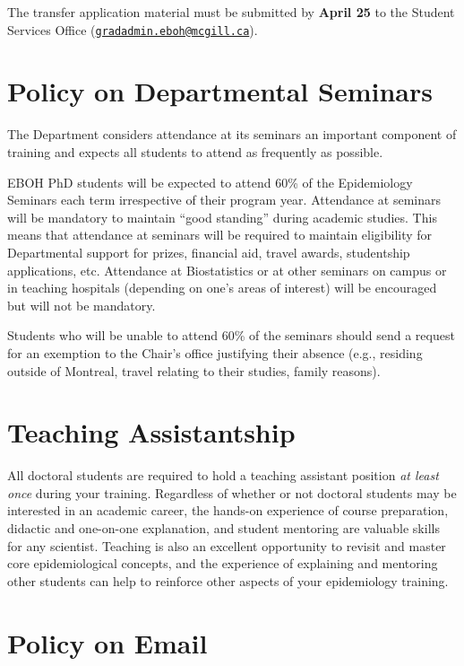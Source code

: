 \documentclass[
  openany]{book}
\begin{document}
The transfer application material must be submitted by \textbf{April 25} to the Student Services Office (\href{mailto:gradadmin.eboh@mcgill.ca}{\nolinkurl{gradadmin.eboh@mcgill.ca}}).

\hypertarget{policy-on-departmental-seminars}{%
\section{Policy on Departmental Seminars}\label{policy-on-departmental-seminars}}

The Department considers attendance at its seminars an important component of training and expects all students to attend as frequently as possible.

EBOH PhD students will be expected to attend 60\% of the Epidemiology Seminars each term irrespective of their program year. Attendance at seminars will be mandatory to maintain ``good standing'' during academic studies. This means that attendance at seminars will be required to maintain eligibility for Departmental support for prizes, financial aid, travel awards, studentship applications, etc. Attendance at Biostatistics or at other seminars on campus or in teaching hospitals (depending on one's areas of interest) will be encouraged but will not be mandatory.

Students who will be unable to attend 60\% of the seminars should send a request for an exemption to the Chair's office justifying their absence (e.g., residing outside of Montreal, travel relating to their studies, family reasons).

\hypertarget{teaching-assistantship}{%
\section{Teaching Assistantship}\label{teaching-assistantship}}

All doctoral students are required to hold a teaching assistant position \emph{at least once} during your training. Regardless of whether or not doctoral students may be interested in an academic career, the hands-on experience of course preparation, didactic and one-on-one explanation, and student mentoring are valuable skills for any scientist. Teaching is also an excellent opportunity to revisit and master core epidemiological concepts, and the experience of explaining and mentoring other students can help to reinforce other aspects of your epidemiology training.

\hypertarget{policy-on-email}{%
\section{Policy on Email}\label{policy-on-email}}
\end{document}
